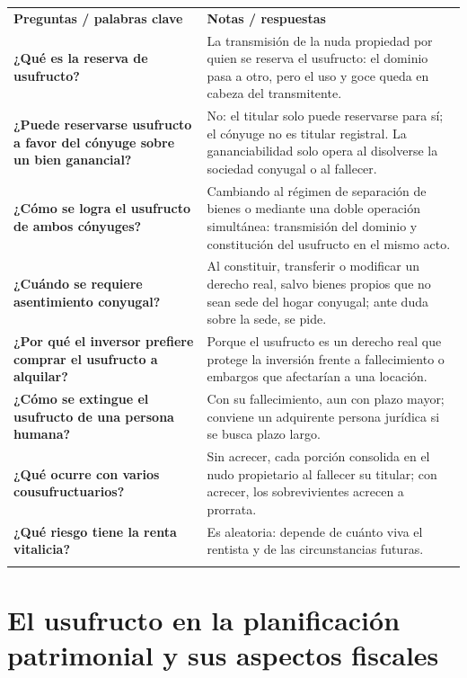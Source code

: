 \documentclass[12pt,oneside]{book}
\newcommand{\cq}[1]{\textbf{#1}}
\newcommand{\cornell}[3]{%
  \par\medskip\noindent\begingroup
  \renewcommand{\arraystretch}{1.25}%
  \begin{tabularx}{\textwidth}{|>{\raggedright\arraybackslash}p{0.27\textwidth}|>{\raggedright\arraybackslash}X|}
    \hline
    \multicolumn{2}{|>{\centering\arraybackslash}X|}{\cellcolor{azulacad!12}\textbf{Cuadro Cornell --- #1}}\\ \hline
    \cellcolor{gray!10}\textbf{Preguntas / palabras clave} & \cellcolor{gray!10}\textbf{Notas / respuestas} \\ \hline
    #2
    \multicolumn{2}{|>{\raggedright\arraybackslash}X|}{\cellcolor{azulacad!6}\textbf{Resumen.} #3}\\ \hline
  \end{tabularx}%
  \endgroup\par\medskip}
\begin{document}
\cornell{El usufructo: concepto, constitución y régimen}{
\cq{¿Qué es la reserva de usufructo?} & La transmisión de la nuda propiedad por quien se reserva el usufructo: el dominio pasa a otro, pero el uso y goce queda en cabeza del transmitente. \\ \hline
\cq{¿Puede reservarse usufructo a favor del cónyuge sobre un bien ganancial?} & No: el titular solo puede reservarse para sí; el cónyuge no es titular registral. La gananciabilidad solo opera al disolverse la sociedad conyugal o al fallecer. \\ \hline
\cq{¿Cómo se logra el usufructo de ambos cónyuges?} & Cambiando al régimen de separación de bienes o mediante una doble operación simultánea: transmisión del dominio y constitución del usufructo en el mismo acto. \\ \hline
\cq{¿Cuándo se requiere asentimiento conyugal?} & Al constituir, transferir o modificar un derecho real, salvo bienes propios que no sean sede del hogar conyugal; ante duda sobre la sede, se pide. \\ \hline
\cq{¿Por qué el inversor prefiere comprar el usufructo a alquilar?} & Porque el usufructo es un derecho real que protege la inversión frente a fallecimiento o embargos que afectarían a una locación. \\ \hline
\cq{¿Cómo se extingue el usufructo de una persona humana?} & Con su fallecimiento, aun con plazo mayor; conviene un adquirente persona jurídica si se busca plazo largo. \\ \hline
\cq{¿Qué ocurre con varios cousufructuarios?} & Sin acrecer, cada porción consolida en el nudo propietario al fallecer su titular; con acrecer, los sobrevivientes acrecen a prorrata. \\ \hline
\cq{¿Qué riesgo tiene la renta vitalicia?} & Es aleatoria: depende de cuánto viva el rentista y de las circunstancias futuras. \\ \hline
}{El usufructo desdobla el dominio: el nudo propietario conserva la disposición y el usufructuario el uso y goce. Su constitución exige atender a la titularidad registral, al asentimiento conyugal y al derecho de acrecer, y su extinción con la muerte del usufructuario condiciona todo diseño de largo plazo.}

\chapter{El usufructo en la planificación patrimonial y sus aspectos fiscales}
\label{cap:usufructoplan}
\end{document}
